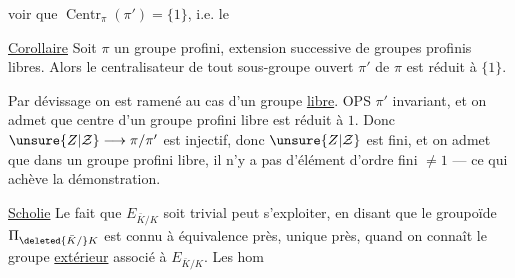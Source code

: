 voir que $\operatorname{Centr}_{\pi}(\pi')=\{1\}$, i.e. le

\uline{Corollaire} Soit $\pi$ un groupe profini, extension successive de groupes profinis libres. Alors le centralisateur  de tout sous-groupe ouvert $\pi'$ de $\pi$ est réduit à $\{1\}$.

Par dévissage on est ramené au cas d'un groupe  \uline{libre}.  OPS $\pi'$ invariant, et on admet que  centre d'un groupe profini libre est réduit à $1$.
Donc $\unsure{Z|\mathcal Z}\longrightarrow\pi/\pi'$ est injectif, donc $\unsure{Z|\mathcal Z}$ est fini, et on admet que dans un groupe profini libre, il n'y a pas d'élément d'ordre fini $\neq1$ --- ce qui achève la démonstration.

\uline{Scholie} Le fait que $E_{\bar K/K}$ soit   trivial peut s'exploiter, en disant que le groupoïde $\Pi_{\deleted{\bar K/}K}$  est connu à équivalence près,  unique près, quand on connaît le groupe \uline{extérieur} associé à $E_{\bar K/K}$. Les hom
